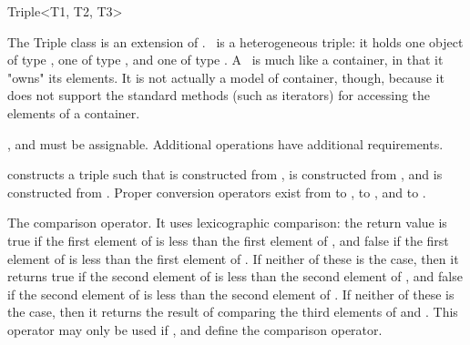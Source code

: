 
\begin{ccRefClass}{Triple<T1, T2, T3>}
  
  \ccDefinition The Triple class is an extension of .
  \ccRefName\ is a heterogeneous triple: it holds one object of type
  , one of type , and one of type .  A
  \ccRefName\ is much like a container, in that it "owns" its
  elements. It is not actually a model of container, though, because
  it does not support the standard methods (such as iterators) for
  accessing the elements of a container.

  
  \ccRequirements {},  and  must be assignable.
  Additional operations have additional requirements.


  \ccTypes
  \ccGlue
  \ccGlue

  \ccGlue
  \ccGlue

  \ccCreation
  
  
  
   {constructs a triple such that  is constructed
    from ,  is constructed from , and
     is constructed from . \ccRequire Proper
    conversion operators exist from  to ,  to
    , and  to .}

   {The
    comparison operator. It uses lexicographic comparison: the return
    value is true if the first element of  is less than the
    first element of , and false if the first element of
     is less than the first element of . If neither of
    these is the case, then it returns true if the second element of
     is less than the second element of , and false if
    the second element of  is less than the second element of
    .  If neither of these is the case, then it returns the
    result of comparing the third elements of  and .
    This operator may only be used if ,  and 
    define the comparison operator.}
  

\end{ccRefClass}
